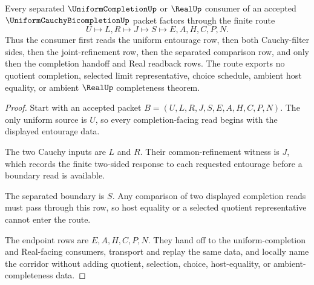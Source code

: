 \begin{theorem}
\label{thm:uniform-cauchy-bicompletion-separated-route}
Every separated $\UniformCompletionUp$ or $\RealUp$ consumer of an accepted $\UniformCauchyBicompletionUp$ packet factors through the finite route
$$
U \longmapsto L,R \longmapsto J \longmapsto S \longmapsto E,A,H,C,P,N .
$$
Thus the consumer first reads the uniform entourage row, then both Cauchy-filter sides, then the joint-refinement row, then the separated comparison row, and only then the completion handoff and Real readback rows. The route exports no quotient completion, selected limit representative, choice schedule, ambient host equality, or ambient $\RealUp$ completeness theorem.
\end{theorem}
\begin{proof}
Start with an accepted packet $B=(U,L,R,J,S,E,A,H,C,P,N)$. The only uniform source is $U$, so every completion-facing read begins with the displayed entourage data.

The two Cauchy inputs are $L$ and $R$. Their common-refinement witness is $J$, which records the finite two-sided response to each requested entourage before a boundary read is available.

The separated boundary is $S$. Any comparison of two displayed completion reads must pass through this row, so host equality or a selected quotient representative cannot enter the route.

The endpoint rows are $E,A,H,C,P,N$. They hand off to the uniform-completion and Real-facing consumers, transport and replay the same data, and locally name the corridor without adding quotient, selection, choice, host-equality, or ambient-completeness data.
\end{proof}



